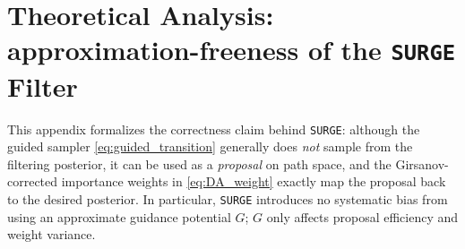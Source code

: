 \documentclass{article}
\theoremstyle{plain}
\newtheorem{lemma}[theorem]{Lemma}
\theoremstyle{definition}
\theoremstyle{remark}
\begin{document}




\section{Theoretical Analysis: approximation-freeness of the \texttt{SURGE} Filter}
\label{app:theory}

This appendix formalizes the correctness claim behind \texttt{SURGE}: although the guided sampler
\eqref{eq:guided_transition} generally does \emph{not} sample from the filtering posterior, it can be used
as a \emph{proposal} on path space, and the Girsanov-corrected importance weights in \eqref{eq:DA_weight}
exactly map the proposal back to the desired posterior. In particular, \texttt{SURGE} introduces no
systematic bias from using an approximate guidance potential $G$; $G$ only affects proposal efficiency
and weight variance.
\end{document}
